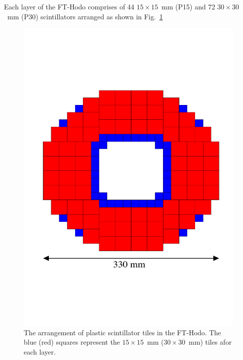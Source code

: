 Each layer of the FT-Hodo comprises of 44 $15\times 15$~mm (P15) and 72 $30\times 30$~mm (P30) scintillators arranged as shown in Fig.~\ref{Fig:FTHodoLayout}  
\begin{figure}[th!]
\centering 
\includegraphics[width=0.85\columnwidth]{./fig/FTHodoLayout.pdf} 
\caption{The arrangement of plastic scintillator tiles in the FT-Hodo. The blue (red) squares represent the $15\times 15$~mm ($30\times 30$~mm) tiles afor each layer. } 
\label{Fig:FTHodoLayout} 
\end{figure}
